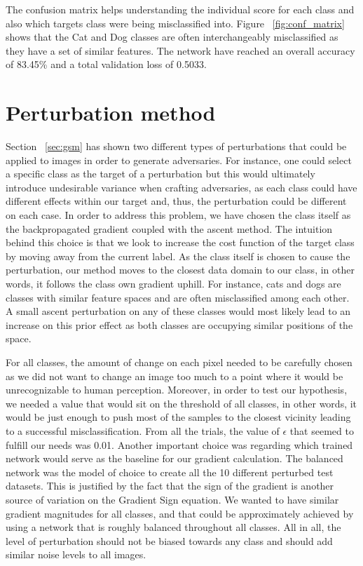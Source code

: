 The confusion matrix helps understanding the individual score for each class and also which targets class were being misclassified into. Figure ~\ref{fig:conf_matrix} shows that the Cat and Dog classes are often interchangeably misclassified as they have a set of similar features. The network have reached an overall accuracy of 83.45\% and a total validation loss of 0.5033.

\section{Perturbation method}
Section ~\ref{sec:gsm} has shown two different types of perturbations that could be applied to images in order to generate adversaries. For instance, one could select a specific class as the target of a perturbation but this would ultimately introduce undesirable variance when crafting adversaries, as each class could have different effects within our target and, thus, the perturbation could be different on each case. In order to address this problem, we have chosen the class itself as the backpropagated gradient coupled with the ascent method. The intuition behind this choice is that we look to increase the cost function of the target class by moving away from the current label. As the class itself is chosen to cause the perturbation, our method moves to the closest data domain to our class, in other words, it follows the class own gradient uphill. For instance, cats and dogs are classes with similar feature spaces and are often misclassified among each other. A small ascent perturbation on any of these classes would most likely lead to an increase on this prior effect as both classes are occupying similar positions of the space. 

For all classes, the amount of change on each pixel needed to be carefully chosen as we did not want to change an image too much to a point where it would be unrecognizable to human perception. Moreover, in order to test our hypothesis, we needed a value that would sit on the threshold of all classes, in other words, it would be just enough to push most of the samples to the closest vicinity leading to a successful misclassification. From all the trials, the value of $\epsilon$ that seemed to fulfill our needs was 0.01. Another important choice was regarding which trained network would serve as the baseline for our gradient calculation. The balanced network was the model of choice to create all the 10 different perturbed test datasets. This is justified by the fact that the sign of the gradient is another source of variation on the Gradient Sign equation. We wanted to have similar gradient magnitudes for all classes, and that could be approximately achieved by using a network that is roughly balanced throughout all classes. All in all, the level of perturbation should not be biased towards any class and should add similar noise levels to all images.

